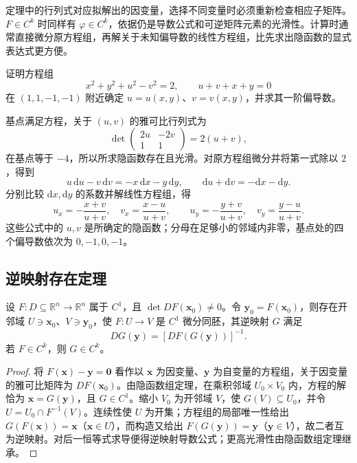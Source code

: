 \documentclass[UTF8,12pt,a4paper,fontset=fandol]{ctexbook}
\begin{document}
定理中的行列式对应拟解出的因变量，选择不同变量时必须重新检查相应子矩阵。$F\in C^k$ 时同样有 $\varphi\in C^k$，依据仍是导数公式和可逆矩阵元素的光滑性。计算时通常直接微分原方程组，再解关于未知偏导数的线性方程组，比先求出隐函数的显式表达式更方便。

\begin{example}
\label{ex:implicit-system-computation-ch14}
证明方程组
\[
    x^2+y^2+u^2-v^2=2,\qquad u+v+x+y=0
\]
在 $(1,1,-1,-1)$ 附近确定 $u=u(x,y)$、$v=v(x,y)$，并求其一阶偏导数。
\end{example}
\begin{solve}
基点满足方程，关于 $(u,v)$ 的雅可比行列式为
\[
    \det\begin{pmatrix}2u&-2v\\1&1\end{pmatrix}
    =2(u+v),
\]
在基点等于 $-4$，所以所求隐函数存在且光滑。对原方程组微分并将第一式除以 $2$，得到
\[
    u\,\mathrm du-v\,\mathrm dv=-x\,\mathrm dx-y\,\mathrm dy,
    \qquad \mathrm du+\mathrm dv=-\mathrm dx-\mathrm dy.
\]
分别比较 $\mathrm dx,\mathrm dy$ 的系数并解线性方程组，得
\[
    u_x=-\frac{x+v}{u+v},\quad v_x=\frac{x-u}{u+v},\qquad
    u_y=-\frac{y+v}{u+v},\quad v_y=\frac{y-u}{u+v}.
\]
这些公式中的 $u,v$ 是所确定的隐函数；分母在足够小的邻域内非零，基点处的四个偏导数依次为 $0,-1,0,-1$。
\end{solve}

\subsection{逆映射存在定理}
\label{subsec:inverse-mapping-existence-theorem}

\begin{theorem}[逆映射存在定理]
\label{thm:inverse-function-ch14}
设 $F:D\subseteq\mathbb R^n\to\mathbb R^n$ 属于 $C^1$，且 $\det DF(\boldsymbol x_0)\ne0$。令 $\boldsymbol y_0=F(\boldsymbol x_0)$，则存在开邻域 $U\ni\boldsymbol x_0$、$V\ni\boldsymbol y_0$，使 $F:U\to V$ 是 $C^1$ 微分同胚，其逆映射 $G$ 满足
\[
    DG(\boldsymbol y)=[DF(G(\boldsymbol y))]^{-1}.
\]
若 $F\in C^k$，则 $G\in C^k$。
\end{theorem}
\begin{proof}
将 $F(\boldsymbol x)-\boldsymbol y=\boldsymbol0$ 看作以 $\boldsymbol x$ 为因变量、$\boldsymbol y$ 为自变量的方程组，关于因变量的雅可比矩阵为 $DF(\boldsymbol x_0)$。由隐函数组定理，在乘积邻域 $U_0\times V_0$ 内，方程的解恰为 $\boldsymbol x=G(\boldsymbol y)$，且 $G\in C^1$。缩小 $V_0$ 为开邻域 $V$，使 $G(V)\subseteq U_0$，并令 $U=U_0\cap F^{-1}(V)$。连续性使 $U$ 为开集；方程组的局部唯一性给出 $G(F(\boldsymbol x))=\boldsymbol x$（$\boldsymbol x\in U$），而构造又给出 $F(G(\boldsymbol y))=\boldsymbol y$（$\boldsymbol y\in V$），故二者互为逆映射。对后一恒等式求导便得逆映射导数公式；更高光滑性由隐函数组定理继承。
\end{proof}
\end{document}
